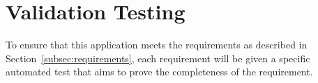 \section{Validation Testing}

To ensure that this application meets the requirements as described in Section~\ref{subsec:requirements}, each requirement will be given a specific automated test that aims to prove the completeness of the requirement.
